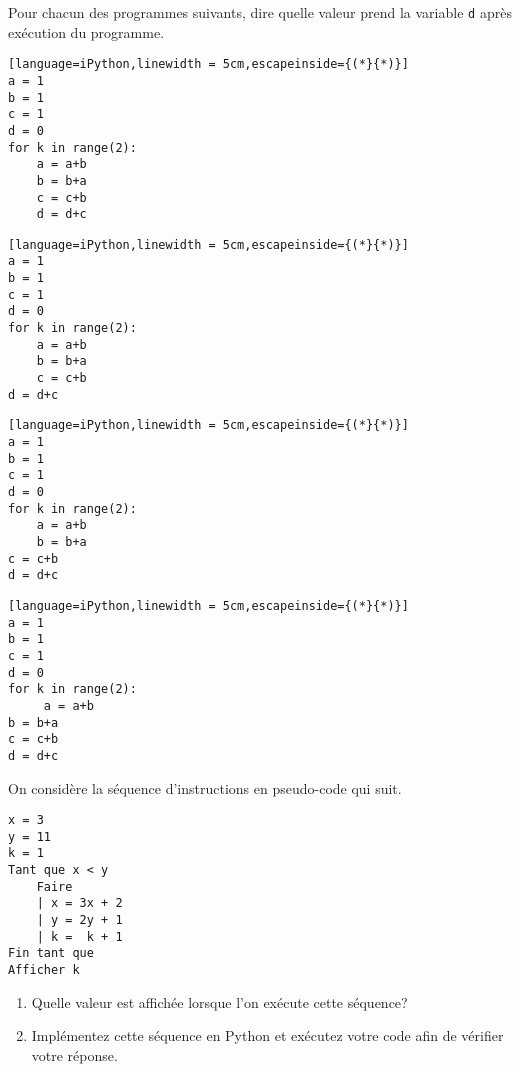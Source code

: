 \begin{exercise}
	Pour chacun des programmes suivants, dire quelle valeur prend la variable \texttt{d} après exécution du programme.
	\begin{center}
		\begin{varwidth}[t]{.5\textwidth}
			\begin{lstlisting}[language=iPython,linewidth = 5cm,escapeinside={(*}{*)}]
a = 1
b = 1
c = 1
d = 0
for k in range(2):
    a = a+b
    b = b+a
    c = c+b
    d = d+c
\end{lstlisting}	
		\end{varwidth}\hspace{2cm}
		\begin{varwidth}[t]{.5\textwidth}
			\begin{lstlisting}[language=iPython,linewidth = 5cm,escapeinside={(*}{*)}]
a = 1
b = 1
c = 1
d = 0
for k in range(2):
    a = a+b
    b = b+a
    c = c+b
d = d+c
\end{lstlisting}	
		\end{varwidth}\vspace{1cm}
		\begin{varwidth}[t]{.5\textwidth}
			\begin{lstlisting}[language=iPython,linewidth = 5cm,escapeinside={(*}{*)}]
a = 1
b = 1
c = 1
d = 0
for k in range(2):
    a = a+b
    b = b+a
c = c+b
d = d+c
\end{lstlisting}	
		\end{varwidth}\hspace{2cm}
		\begin{varwidth}[t]{.5\textwidth}
			\begin{lstlisting}[language=iPython,linewidth = 5cm,escapeinside={(*}{*)}]
a = 1
b = 1
c = 1
d = 0
for k in range(2):
     a = a+b
b = b+a
c = c+b
d = d+c
\end{lstlisting}	
		\end{varwidth}
	\end{center}
\end{exercise}

\newpage

\begin{exercise}
On considère la séquence d'instructions en pseudo-code qui suit.
\begin{center}
\begin{varwidth}[t]{\textwidth}
\begin{lstlisting}[language=Pseudo,linewidth = 5cm]
x = 3
y = 11
k = 1
Tant que x < y
    Faire
    | x = 3x + 2
    | y = 2y + 1
    | k =  k + 1
Fin tant que
Afficher k
\end{lstlisting}\end{varwidth}\end{center}
\begin{enumerate}
	\item Quelle valeur est affichée lorsque l'on exécute cette séquence?
	\item Implémentez cette séquence en Python et exécutez votre code afin de vérifier votre réponse.
\end{enumerate}
\end{exercise}

